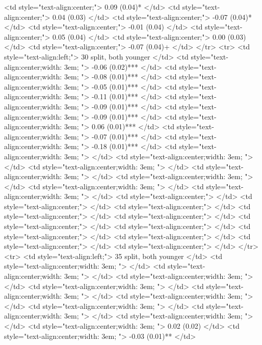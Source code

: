    <td style="text-align:center;"> 0.09 (0.04)* </td>
   <td style="text-align:center;"> 0.04 (0.03) </td>
   <td style="text-align:center;"> -0.07 (0.04)* </td>
   <td style="text-align:center;"> -0.01 (0.04) </td>
   <td style="text-align:center;"> 0.05 (0.04) </td>
   <td style="text-align:center;"> 0.00 (0.03) </td>
   <td style="text-align:center;"> -0.07 (0.04)+ </td>
  </tr>
  <tr>
   <td style="text-align:left;"> 30 split, both younger </td>
   <td style="text-align:center;width: 3em; "> -0.06 (0.02)*** </td>
   <td style="text-align:center;width: 3em; "> -0.08 (0.01)*** </td>
   <td style="text-align:center;width: 3em; "> -0.05 (0.01)*** </td>
   <td style="text-align:center;width: 3em; "> -0.11 (0.01)*** </td>
   <td style="text-align:center;width: 3em; "> -0.09 (0.01)*** </td>
   <td style="text-align:center;width: 3em; "> -0.09 (0.01)*** </td>
   <td style="text-align:center;width: 3em; "> 0.06 (0.01)*** </td>
   <td style="text-align:center;width: 3em; "> -0.07 (0.01)*** </td>
   <td style="text-align:center;width: 3em; "> -0.18 (0.01)*** </td>
   <td style="text-align:center;width: 3em; ">  </td>
   <td style="text-align:center;width: 3em; ">  </td>
   <td style="text-align:center;width: 3em; ">  </td>
   <td style="text-align:center;width: 3em; ">  </td>
   <td style="text-align:center;width: 3em; ">  </td>
   <td style="text-align:center;width: 3em; ">  </td>
   <td style="text-align:center;width: 3em; ">  </td>
   <td style="text-align:center;">  </td>
   <td style="text-align:center;">  </td>
   <td style="text-align:center;">  </td>
   <td style="text-align:center;">  </td>
   <td style="text-align:center;">  </td>
   <td style="text-align:center;">  </td>
   <td style="text-align:center;">  </td>
   <td style="text-align:center;">  </td>
   <td style="text-align:center;">  </td>
   <td style="text-align:center;">  </td>
   <td style="text-align:center;">  </td>
  </tr>
  <tr>
   <td style="text-align:left;"> 35 split, both younger </td>
   <td style="text-align:center;width: 3em; ">  </td>
   <td style="text-align:center;width: 3em; ">  </td>
   <td style="text-align:center;width: 3em; ">  </td>
   <td style="text-align:center;width: 3em; ">  </td>
   <td style="text-align:center;width: 3em; ">  </td>
   <td style="text-align:center;width: 3em; ">  </td>
   <td style="text-align:center;width: 3em; ">  </td>
   <td style="text-align:center;width: 3em; ">  </td>
   <td style="text-align:center;width: 3em; ">  </td>
   <td style="text-align:center;width: 3em; "> 0.02 (0.02) </td>
   <td style="text-align:center;width: 3em; "> -0.03 (0.01)** </td>
